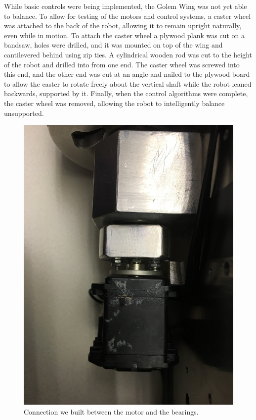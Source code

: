 \documentclass[12pt,conference,onecolumn,titlepage]{IEEEtran} %
\begin{document}
While basic controls were being implemented, the Golem Wing was not yet able to balance. To allow for testing of the motors and control systems, a caster wheel was attached to the back of the robot, allowing it to remain upright naturally, even while in motion. To attach the caster wheel a plywood plank was cut on a bandsaw, holes were drilled, and it was mounted on top of the wing and cantilevered behind using zip ties. A cylindrical wooden rod was cut to the height of the robot and drilled into from one end. The caster wheel was screwed into this end, and the other end was cut at an angle and nailed to the plywood board to allow the caster to rotate freely about the vertical shaft while the robot leaned backwards, supported by it. Finally, when the control algorithms were complete, the caster wheel was removed, allowing the robot to intelligently balance unsupported.
\begin{figure}[h!]
  \centering
  \includegraphics[width=\textwidth]{motor2bearing.jpg}
  \caption{Connection we built between the motor and the bearings.}
  \label{fig:motor2bearing}
\end{figure}
\end{document}
